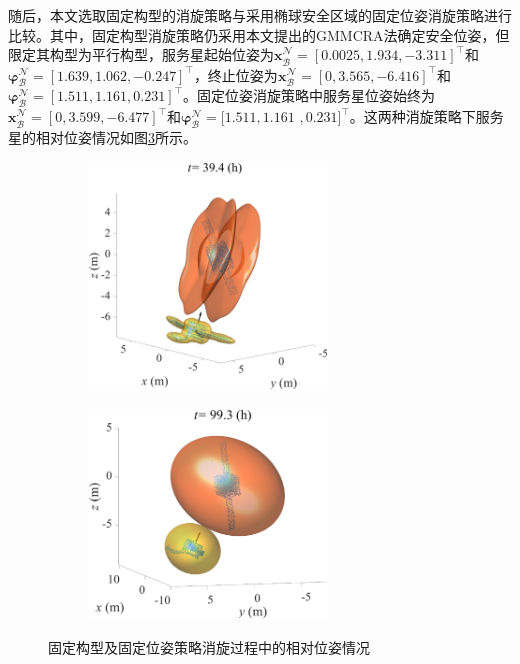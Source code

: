 \documentclass[lang=chs, degree=master, blindreview=false, winfonts=true]{yanputhesis}
\begin{document}
随后，本文选取固定构型的消旋策略\cite{Liuprec2022}与采用椭球安全区域的固定位姿消旋策略\cite{gomezGuidanceNavigationControl2017}进行比较。其中，固定构型消旋策略仍采用本文提出的GMMCRA法确定安全位姿，但限定其构型为平行构型，服务星起始位姿为${\boldsymbol{x}}_{\mathcal{B}}^{\mathcal{N}}=\left[0.0025,1.934,-3.311\right]^{\top}$和${\boldsymbol{\varphi}}_{\mathcal{B}}^{\mathcal{N}}=\left[1.639,1.062,-0.247\right]^{\top}$，终止位姿为${\boldsymbol{x}}_{\mathcal{B}}^{\mathcal{N}}=\left[0,3.565,-6.416\right]^{\top}$和${\boldsymbol{\varphi}}_{\mathcal{B}}^{\mathcal{N}}=\left[1.511,1.161,0.231\right]^{\top}$。固定位姿消旋策略中服务星位姿始终为${\boldsymbol{x}}_{\mathcal{B}}^{\mathcal{N}}=\left[0,3.599,-6.477\right]^{\top}$和${\boldsymbol{\varphi}}_{\mathcal{B}}^{\mathcal{N}}=[1.511,1.161$ $,0.231]^{\top}$。这两种消旋策略下服务星的相对位姿情况如图\ref{Fig.posefix_detumble_pose}所示。
\begin{figure}[htb!]
	\centering
	\begin{minipage}[t]{0.96\textwidth}
		\centering
		\begin{subfigure}[t]{0.47\textwidth}
			\centering
			\includegraphics[width = 2.5in]{picture/posefix_detumble_time.eps}
			\caption{ }
			\label{fig:posefix_detumble_pose}
		\end{subfigure}\hfill
		\begin{subfigure}[t]{0.47\textwidth}
			\centering
			\includegraphics[width = 2.5in]{picture/fix_detumble_time.eps}
			\caption{ }
			\label{fig:fix_detumble_pose}
		\end{subfigure}
	\end{minipage}
	\caption{固定构型及固定位姿策略消旋过程中的相对位姿情况\label{Fig.posefix_detumble_pose}}
\end{figure}
\end{document}
